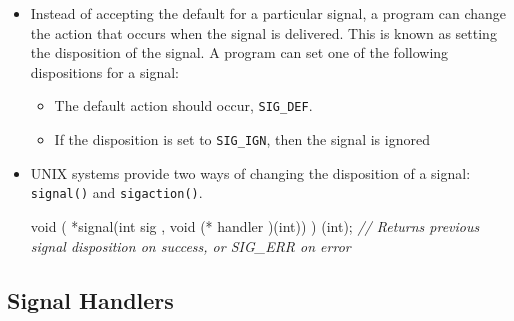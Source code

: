 \documentclass[]{article}
\newenvironment{Shaded}{}{}
\newcommand{\DataTypeTok}[1]{\textcolor[rgb]{0.56,0.13,0.00}{#1}}
\newcommand{\CommentTok}[1]{\textcolor[rgb]{0.38,0.63,0.69}{\textit{#1}}}
\newcommand{\NormalTok}[1]{#1}
\begin{document}
\begin{itemize}
\item
  Instead of accepting the default for a particular signal, a program
  can change the action that occurs when the signal is delivered. This
  is known as setting the disposition of the signal. A program can set
  one of the following dispositions for a signal:

  \begin{itemize}
  \item
    The default action should occur, \texttt{SIG\_DEF}.
  \item
    If the disposition is set to \texttt{SIG\_IGN}, then the signal is
    ignored
  \end{itemize}
\item
  UNIX systems provide two ways of changing the disposition of a signal:
  \texttt{signal()} and \texttt{sigaction()}.

\begin{Shaded}
\begin{Highlighting}[]
\DataTypeTok{void}\NormalTok{ ( *signal(}\DataTypeTok{int}\NormalTok{ sig , }\DataTypeTok{void}\NormalTok{ (* handler )(}\DataTypeTok{int}\NormalTok{)) ) (}\DataTypeTok{int}\NormalTok{);}
\CommentTok{// Returns previous signal disposition on success, or SIG_ERR on error}
\end{Highlighting}
\end{Shaded}
\end{itemize}

\subsection{\texorpdfstring{\textbf{Signal
Handlers}}{Signal Handlers}}\label{header-n496}
\end{document}
